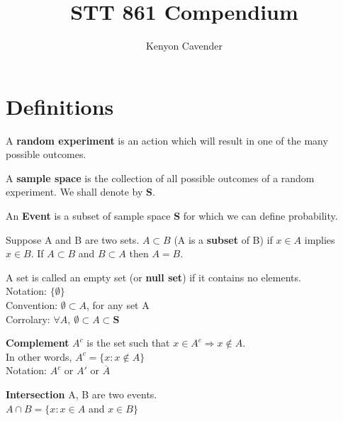 \documentclass[12pt, oneside, letterpaper]{notes}
\begin{document}
\title{STT 861 Compendium}
\author{Kenyon Cavender}
\maketitle

\section*{Definitions}

\begin{mydef}
  A \textbf{random experiment} is an action which will result 
  in one of the many possible outcomes. 
\end{mydef}

\begin{mydef}
  A \textbf{sample space} is the collection of all possible 
  outcomes of a random experiment.  We shall denote by \textbf{S}.
\end{mydef}

\begin{mydef}
  An \textbf{Event} is a subset of sample space \textbf{S} for 
  which we can define probability.
\end{mydef}

\begin{mydef}
  Suppose A and B are two sets.  $A \subset B$ (A is a 
  \textbf{subset} of B) if $x \in A$ implies $x \in B$. 
  If $A \subset B$ and $B \subset A$ then $A=B$.
\end{mydef}

\begin{mydef}
  A set is called an empty set (or \textbf{null set}) if it contains 
  no elements.\\
  \indent Notation: $\{ \emptyset \}$ \\
  \indent Convention: $\emptyset \subset A$, for any set A \\
  \indent Corrolary: $\forall A, \: \emptyset \subset A \subset \textbf{S}$
\end{mydef}

\begin{mydef}
  \textbf{Complement} $A^c$ is the set such that $x \in A^c 
  \Rightarrow x \notin A$.\\
  \indent In other words, $A^c = \{ x : x \notin A \}$ \\
  \indent Notation: $A^c$ or $A'$ or $\overline{A}$
\end{mydef}

\begin{mydef}
  \textbf{Intersection} A, B are two events.  \\
  \indent $A \cap B = \{x: x \in A$ and $x \in B\}$
\end{mydef}
\end{document}
